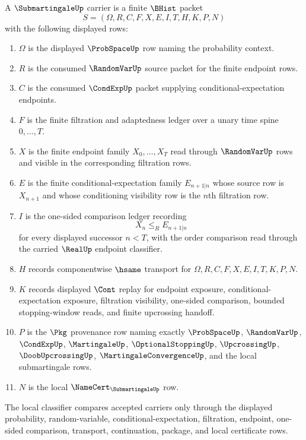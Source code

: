 \begin{definition}
\label{def:submartingale-carrier}
A $\SubmartingaleUp$ carrier is a finite $\BHist$ packet
$$
S=(\Omega,R,C,F,X,E,I,T,H,K,P,N)
$$
with the following displayed rows:
\begin{enumerate}
\item $\Omega$ is the displayed $\ProbSpaceUp$ row naming the probability context.
\item $R$ is the consumed $\RandomVarUp$ source packet for the finite endpoint rows.
\item $C$ is the consumed $\CondExpUp$ packet supplying conditional-expectation endpoints.
\item $F$ is the finite filtration and adaptedness ledger over a unary time spine $0,\ldots,T$.
\item $X$ is the finite endpoint family $X_0,\ldots,X_T$ read through $\RandomVarUp$ rows and visible in the corresponding filtration rows.
\item $E$ is the finite conditional-expectation family $E_{n+1|n}$ whose source row is $X_{n+1}$ and whose conditioning visibility row is the $n$th filtration row.
\item $I$ is the one-sided comparison ledger recording
$$
X_n\leq_R E_{n+1|n}
$$
for every displayed successor $n<T$, with the order comparison read through the carried $\RealUp$ endpoint classifier.
\item $H$ records componentwise $\hsame$ transport for $\Omega,R,C,F,X,E,I,T,K,P,N$.
\item $K$ records displayed $\Cont$ replay for endpoint exposure, conditional-expectation exposure, filtration visibility, one-sided comparison, bounded stopping-window reads, and finite upcrossing handoff.
\item $P$ is the $\Pkg$ provenance row naming exactly $\ProbSpaceUp$, $\RandomVarUp$, $\CondExpUp$, $\MartingaleUp$, $\OptionalStoppingUp$, $\UpcrossingUp$, $\DoobUpcrossingUp$, $\MartingaleConvergenceUp$, and the local submartingale rows.
\item $N$ is the local $\NameCert_{\SubmartingaleUp}$ row.
\end{enumerate}
The local classifier compares accepted carriers only through the displayed probability, random-variable, conditional-expectation, filtration, endpoint, one-sided comparison, transport, continuation, package, and local certificate rows.
\end{definition}

